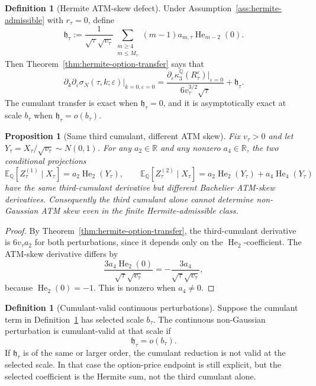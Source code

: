 \documentclass[11pt,a4paper]{amsart}
\theoremstyle{plain}
\newtheorem{proposition}[theorem]{Proposition}
\theoremstyle{definition}
\newtheorem{definition}[theorem]{Definition}
\theoremstyle{remark}
\DeclareMathOperator{\He}{He}
\newcommand{\R}{\mathbb{R}}
\newcommand{\QQ}{\mathbb{Q}}
\newcommand{\EE}{\mathbb{E}}
\begin{document}
\begin{definition}[Hermite ATM-skew defect]
\label{def:hermite-skew-defect}
Under Assumption~\ref{ass:hermite-admissible} with \(r_\tau=0\), define
\[
        \mathfrak h_\tau
        :=
        \frac{1}{\sqrt\tau\sqrt{v_\tau}}
        \sum_{\substack{m\ge4\\ m\le M_\tau}}
        (m-1)a_{m,\tau}\He_{m-2}(0).
\]
Then Theorem~\ref{thm:hermite-option-transfer} says that
\[
        \partial_k\partial_\varepsilon\sigma_N(\tau,k;\varepsilon)
        \big|_{k=0,\varepsilon=0}
        =
        \frac{\partial_\varepsilon\kappa_3^\QQ(R_\tau^\varepsilon)|_{\varepsilon=0}}
        {6v_\tau^{3/2}\sqrt\tau}
        +\mathfrak h_\tau.
\]
The cumulant transfer is exact when \(\mathfrak h_\tau=0\), and it is asymptotically exact at scale
\(b_\tau\) when \(\mathfrak h_\tau=o(b_\tau)\).
\end{definition}

\begin{proposition}[Same third cumulant, different ATM skew]
\label{prop:hermite-same-cumulant-different-skew}
Fix \(v_\tau>0\) and let \(Y_\tau=X_\tau/\sqrt{v_\tau}\sim N(0,1)\).  For any \(a_2\in\R\) and
any nonzero \(a_4\in\R\), the two conditional projections
\[
        \EE_\QQ[Z_\tau^{(1)}\mid X_\tau]=a_2\He_2(Y_\tau),
        \qquad
        \EE_\QQ[Z_\tau^{(2)}\mid X_\tau]=a_2\He_2(Y_\tau)+a_4\He_4(Y_\tau)
\]
have the same third-cumulant derivative but different Bachelier ATM-skew derivatives.
Consequently the third cumulant alone cannot determine non-Gaussian ATM skew even in the finite
Hermite-admissible class.
\end{proposition}

\begin{proof}
By Theorem~\ref{thm:hermite-option-transfer}, the third-cumulant derivative is \(6v_\tau a_2\) for
both perturbations, since it depends only on the \(\He_2\)-coefficient.  The ATM-skew derivative
differs by
\[
        \frac{3a_4\He_2(0)}{\sqrt\tau\sqrt{v_\tau}}
        =
        -\frac{3a_4}{\sqrt\tau\sqrt{v_\tau}},
\]
because \(\He_2(0)=-1\).  This is nonzero when \(a_4\ne0\).
\end{proof}

\begin{definition}[Cumulant-valid continuous perturbations]
\label{def:cumulant-pass-diagnostic}
Suppose the cumulant term in Definition~\ref{def:hermite-skew-defect} has selected scale
\(b_\tau\).  The continuous non-Gaussian perturbation is cumulant-valid at that scale if
\[
        \mathfrak h_\tau=o(b_\tau).
\]
If \(\mathfrak h_\tau\) is of the same or larger order, the cumulant reduction is not valid at the
selected scale.  In that
case the option-price endpoint is still explicit, but the selected coefficient is the Hermite sum,
not the third cumulant alone.
\end{definition}
\end{document}
